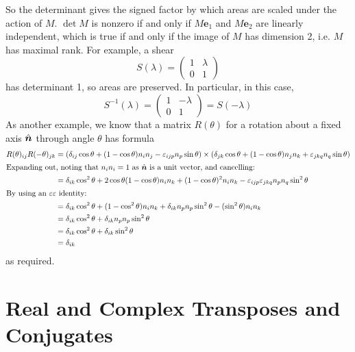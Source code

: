 \documentclass{article}
\begin{document}
So the determinant gives the signed factor by which areas are scaled under the action of $M$. $\det M$ is nonzero if and only if $M\bm e_1$ and $M\bm e_2$ are linearly independent, which is true if and only if the image of $M$ has dimension 2, i.e. $M$ has maximal rank. For example, a shear
\[ S(\lambda) = \begin{pmatrix}
		1 & \lambda \\ 0 & 1
	\end{pmatrix} \]
has determinant 1, so areas are preserved. In particular, in this case,
\[ S^{-1}(\lambda) = \begin{pmatrix}
		1 & -\lambda \\ 0 & 1
	\end{pmatrix} = S(-\lambda) \]
As another example, we know that a matrix $R(\theta)$ for a rotation about a fixed axis $\hat{\bm n}$ through angle $\theta$ has formula
\begin{align*}
	R(\theta)_{ij} R(-\theta)_{jk} & = (\delta_{ij}\cos \theta + (1 - \cos \theta) n_i n_j - \varepsilon_{ijp}n_p \sin \theta) \times (\delta_{jk}\cos \theta + (1 - \cos \theta) n_j n_k + \varepsilon_{jkq}n_q \sin \theta) \\
	\intertext{Expanding out, noting that $n_in_i = 1$ as $\hat{\bm n}$ is a unit vector, and cancelling:}
	                               & = \delta_{ik} \cos^2 \theta + 2\cos \theta(1 - \cos \theta) n_in_k + (1 - \cos \theta)^2n_in_k - \varepsilon_{ijp}\varepsilon_{jkq} n_p n_q \sin^2 \theta                                \\
	\intertext{By using an $\varepsilon\varepsilon$ identity:}
	                               & = \delta_{ik}\cos^2\theta + (1 - \cos^2 \theta)n_in_k + \delta_{ik}n_pn_p \sin^2 \theta - (\sin^2 \theta)n_in_k                                                                          \\
	                               & = \delta_{ik}\cos^2\theta + \delta_{ik}n_pn_p \sin^2 \theta                                                                                                                              \\
	                               & = \delta_{ik}\cos^2\theta + \delta_{ik} \sin^2 \theta                                                                                                                                    \\
	                               & = \delta_{ik}
\end{align*}
as required.

\section{Real and Complex Transposes and Conjugates}
\end{document}
